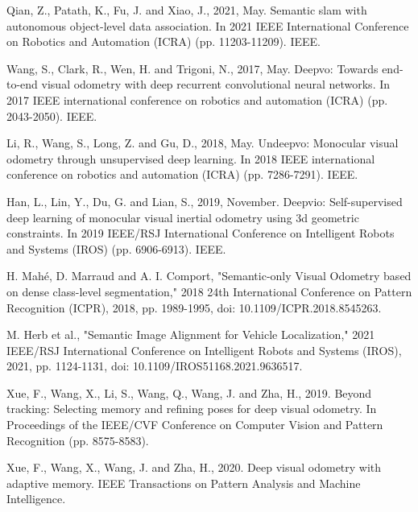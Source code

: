 \documentclass[conference]{IEEEtran}
\begin{document}
\begin{thebibliography}{1}
Qian, Z., Patath, K., Fu, J. and Xiao, J., 2021, May. Semantic slam with autonomous object-level data association. In 2021 IEEE International Conference on Robotics and Automation (ICRA) (pp. 11203-11209). IEEE.

Wang, S., Clark, R., Wen, H. and Trigoni, N., 2017, May. Deepvo: Towards end-to-end visual odometry with deep recurrent convolutional neural networks. In 2017 IEEE international conference on robotics and automation (ICRA) (pp. 2043-2050). IEEE.

Li, R., Wang, S., Long, Z. and Gu, D., 2018, May. Undeepvo: Monocular visual odometry through unsupervised deep learning. In 2018 IEEE international conference on robotics and automation (ICRA) (pp. 7286-7291). IEEE.

Han, L., Lin, Y., Du, G. and Lian, S., 2019, November. Deepvio: Self-supervised deep learning of monocular visual inertial odometry using 3d geometric constraints. In 2019 IEEE/RSJ International Conference on Intelligent Robots and Systems (IROS) (pp. 6906-6913). IEEE.

H. Mahé, D. Marraud and A. I. Comport, "Semantic-only Visual Odometry based on dense class-level segmentation," 2018 24th International Conference on Pattern Recognition (ICPR), 2018, pp. 1989-1995, doi: 10.1109/ICPR.2018.8545263.

M. Herb et al., "Semantic Image Alignment for Vehicle Localization," 2021 IEEE/RSJ International Conference on Intelligent Robots and Systems (IROS), 2021, pp. 1124-1131, doi: 10.1109/IROS51168.2021.9636517.

Xue, F., Wang, X., Li, S., Wang, Q., Wang, J. and Zha, H., 2019. Beyond tracking: Selecting memory and refining poses for deep visual odometry. In Proceedings of the IEEE/CVF Conference on Computer Vision and Pattern Recognition (pp. 8575-8583).

Xue, F., Wang, X., Wang, J. and Zha, H., 2020. Deep visual odometry with adaptive memory. IEEE Transactions on Pattern Analysis and Machine Intelligence.


\end{thebibliography}




\end{document}
